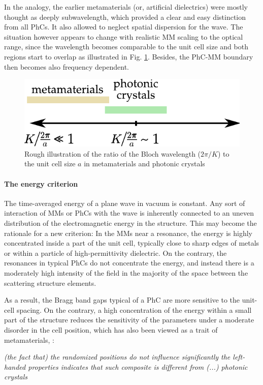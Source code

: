 In the analogy, the earlier metamaterials (or, artificial dielectrics) were mostly thought as deeply subwavelength, which provided a clear and easy distinction from all PhCs. It also allowed to neglect spatial dispersion for the wave. The situation however appears to change with realistic MM scaling to the optical range, since the wavelength becomes comparable to the unit cell size and both regions start to overlap as illustrated in Fig. \ref{fg_mm_phc_diagram}. Besides, the PhC-MM boundary then becomes also frequency dependent.

\begin{figure}[h] \caption{Rough illustration of the ratio of the Bloch wavelength ($2\pi/K$) to the unit cell size $a$ in metamaterials and photonic crystals} \label{fg_mm_phc_diagram} \centering \includegraphics[width=.4\textwidth]{img/mm-phc-diagram.pdf} \end{figure}
\paragraph{The energy criterion} %
The time-averaged energy of a plane wave in vacuum is constant. Any sort of interaction of MMs or PhCs with the wave is inherently connected to an uneven distribution of the electromagnetic energy in the structure. This may become the rationale for a new criterion: In the MMs near a resonance, the energy is highly concentrated inside a part of the unit cell, typically close to sharp edges of metals or within a particle of high-permittivity dielectric. On the contrary, the resonances in typical PhCs do not concentrate the energy, and instead there is a moderately high intensity of the field in the majority of the space between the scattering structure elements.

As a result, the Bragg band gaps typical of a PhC are more sensitive to the unit-cell spacing. %
On the contrary, a high concentration of the energy within a small part of the structure reduces the sensitivity of the parameters under a moderate disorder in the cell position, which has also been viewed as a trait of metamaterials, \cite{peng2007}: 
\begin{displayquote}
	\textit{(the fact that) the randomized positions do not influence significantly the left-handed properties indicates that such composite is different from (...) photonic crystals}
\end{displayquote}

